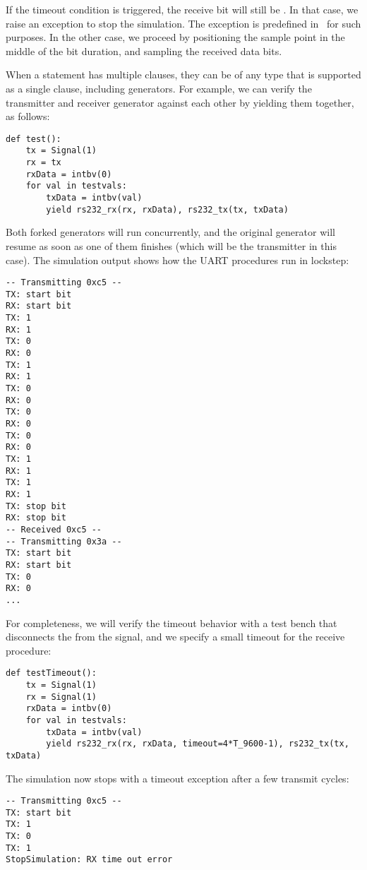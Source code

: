 If the timeout condition is triggered, the receive bit 
will still be . In that case, we raise an exception to stop
the simulation. The  exception is predefined in
\myhdl\ for such purposes. In the other case, we proceed by
positioning the sample point in the middle of the bit duration, and
sampling the received data bits.

When a  statement has multiple clauses, they can be of any
type that is supported as a single clause, including generators. For
example, we can verify the transmitter and receiver generator against
each other by yielding them together, as follows:

\begin{verbatim}
def test():
    tx = Signal(1)
    rx = tx
    rxData = intbv(0)
    for val in testvals:
        txData = intbv(val)
        yield rs232_rx(rx, rxData), rs232_tx(tx, txData)
\end{verbatim}

Both forked generators will run concurrently, and the original
generator will resume as soon as one of them finishes (which will be
the transmitter in this case).  The simulation output shows how
the UART procedures run in lockstep:

\begin{verbatim}
-- Transmitting 0xc5 --
TX: start bit
RX: start bit
TX: 1
RX: 1
TX: 0
RX: 0
TX: 1
RX: 1
TX: 0
RX: 0
TX: 0
RX: 0
TX: 0
RX: 0
TX: 1
RX: 1
TX: 1
RX: 1
TX: stop bit
RX: stop bit
-- Received 0xc5 --
-- Transmitting 0x3a --
TX: start bit
RX: start bit
TX: 0
RX: 0
...
\end{verbatim}

For completeness, we will verify the timeout behavior with a test
bench that disconnects the  from the  signal, and we
specify a small timeout for the receive procedure:

\begin{verbatim}
def testTimeout():
    tx = Signal(1)
    rx = Signal(1)
    rxData = intbv(0)
    for val in testvals:
        txData = intbv(val)
        yield rs232_rx(rx, rxData, timeout=4*T_9600-1), rs232_tx(tx, txData)
\end{verbatim}
 
The simulation now stops with a timeout exception after a few
transmit cycles:

\begin{verbatim}
-- Transmitting 0xc5 --
TX: start bit
TX: 1
TX: 0
TX: 1
StopSimulation: RX time out error
\end{verbatim}

